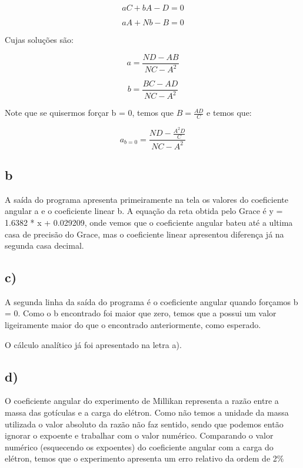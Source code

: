 \documentclass[a4wide]{report}
\begin{document}
\begin{equation}
aC + bA - D = 0
\end{equation}

\begin{equation}
aA + Nb - B = 0
\end{equation}

Cujas soluções são:

\begin{equation}
a = \frac{ND - AB}{NC -A^{2}}
\end{equation}

\begin{equation}
b = \frac{BC - AD}{NC - A^{2}}
\end{equation}

Note que se quisermos forçar b = 0, temos que $B = \frac{AD}{C}$ e temos que:

\begin{equation}
a_{b=0} = \frac{ND - \frac{A^{2}D}{C}}{NC -A^{2}}
\end{equation}

\subsection*{b}
A saída do programa apresenta primeiramente na tela os valores do coeficiente angular a e o coeficiente linear b.
A equação da reta obtida pelo Grace é	 y = 1.6382 * x + 0.029209, onde vemos que o coeficiente angular bateu até a ultima casa de precisão do Grace, mas o coeficiente linear apresentou diferença já na segunda casa decimal.


\subsection*{c)}
A segunda linha da saída do programa é o coeficiente angular quando forçamos b = 0. Como o b encontrado foi maior que zero, temos que a possui um valor ligeiramente maior do que o encontrado anteriormente, como esperado.

O cálculo analítico já foi apresentado na letra a).

\subsection*{d)}
O coeficiente angular do experimento de Millikan representa a razão entre a massa das gotículas e a carga do elétron. Como não temos a unidade da massa utilizada o valor absoluto da razão não faz sentido, sendo que podemos então ignorar o expoente e trabalhar com o valor numérico. Comparando o valor numérico (esquecendo os expoentes) do coeficiente angular com a carga do elétron, temos que o experimento apresenta um erro relativo da ordem de 2$\%$
\end{document}
